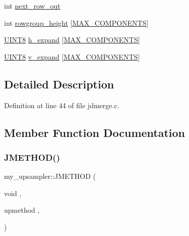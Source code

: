 \begin{DoxyCompactItemize}
\item 
int \mbox{\hyperlink{structmy__upsampler_a9e77765267bd21be6cb005b748034d76}{next\+\_\+row\+\_\+out}}
\item 
int \mbox{\hyperlink{structmy__upsampler_a05806e1394a2638e4912da137b9d4bcd}{rowgroup\+\_\+height}} \mbox{[}\mbox{\hyperlink{jmorecfg_8h_a6d8c910a1fdb6d4762a05f7250e64322}{M\+A\+X\+\_\+\+C\+O\+M\+P\+O\+N\+E\+N\+TS}}\mbox{]}
\item 
\mbox{\hyperlink{jmorecfg_8h_adfb9a8ea1dd59f151065f763e1e9acd6}{U\+I\+N\+T8}} \mbox{\hyperlink{structmy__upsampler_a4a82028e54b1f7e57b2c1f7d63290f65}{h\+\_\+expand}} \mbox{[}\mbox{\hyperlink{jmorecfg_8h_a6d8c910a1fdb6d4762a05f7250e64322}{M\+A\+X\+\_\+\+C\+O\+M\+P\+O\+N\+E\+N\+TS}}\mbox{]}
\item 
\mbox{\hyperlink{jmorecfg_8h_adfb9a8ea1dd59f151065f763e1e9acd6}{U\+I\+N\+T8}} \mbox{\hyperlink{structmy__upsampler_a48df5e8df66ba2f1275f54a617eaf888}{v\+\_\+expand}} \mbox{[}\mbox{\hyperlink{jmorecfg_8h_a6d8c910a1fdb6d4762a05f7250e64322}{M\+A\+X\+\_\+\+C\+O\+M\+P\+O\+N\+E\+N\+TS}}\mbox{]}
\end{DoxyCompactItemize}


\subsection{Detailed Description}


Definition at line 44 of file jdmerge.\+c.



\subsection{Member Function Documentation}
\mbox{\label{structmy__upsampler_a6d4b85127ea561ce45e42fbff490d5d1}} 
\subsubsection{\texorpdfstring{JMETHOD()}{JMETHOD()}}
{\footnotesize\ttfamily my\+\_\+upsampler\+::\+J\+M\+E\+T\+H\+OD (\begin{DoxyParamCaption}\item[{void}]{,  }\item[{upmethod}]{,  }\item[{(\mbox{\hyperlink{jpeglib_8h_a00c7d78af44bd26a901c791ccfc1e178}{j\+\_\+decompress\+\_\+ptr}} cinfo, \mbox{\hyperlink{jpeglib_8h_a4bf858e4d42202287e786bdec2f3b62b}{J\+S\+A\+M\+P\+I\+M\+A\+GE}} input\+\_\+buf, \mbox{\hyperlink{jmorecfg_8h_a04ed4674f6f1d0d50ec241531e38274f}{J\+D\+I\+M\+E\+N\+S\+I\+ON}} in\+\_\+row\+\_\+group\+\_\+ctr, \mbox{\hyperlink{jpeglib_8h_ac9d5d1b829ed51769db69a37271a7e91}{J\+S\+A\+M\+P\+A\+R\+R\+AY}} \mbox{\hyperlink{jdct_8h_ad7e4660a191b1a791748dd44d5a7a0ec}{output\+\_\+buf}})}]{ }\end{DoxyParamCaption})}



